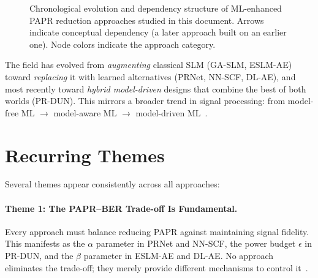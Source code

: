 \begin{figure}[H]
    \caption{Chronological evolution and dependency structure of ML-enhanced
             PAPR reduction approaches studied in this document.
             Arrows indicate conceptual dependency (a later approach built on
             an earlier one).  Node colors indicate the approach category.}
    \label{fig:evolution}
\end{figure}

\begin{keyinsight}
    The field has evolved from \emph{augmenting} classical SLM
    (GA-SLM, ESLM-AE) toward \emph{replacing} it with learned
    alternatives (PRNet, NN-SCF, DL-AE), and most recently
    toward \emph{hybrid model-driven} designs that combine the best of
    both worlds (PR-DUN).
    This mirrors a broader trend in signal processing: from
    model-free ML $\to$ model-aware ML $\to$ model-driven
    ML~\cite{da2024survey}.
\end{keyinsight}

\section{Recurring Themes}
\label{sec:themes}

Several themes appear consistently across all approaches:

\paragraph{Theme 1: The PAPR--BER Trade-off Is Fundamental.}
Every approach must balance reducing PAPR against maintaining signal fidelity.
This manifests as the $\alpha$ parameter in PRNet and NN-SCF, the power budget $\epsilon$ in PR-DUN, and the $\beta$ parameter in ESLM-AE and DL-AE.
No approach eliminates the trade-off; they merely provide different mechanisms to control it~\cite{kim2017novel,zou2021novel,nguyen2022deep,hao2019extended,alnaseri2025deep}.

